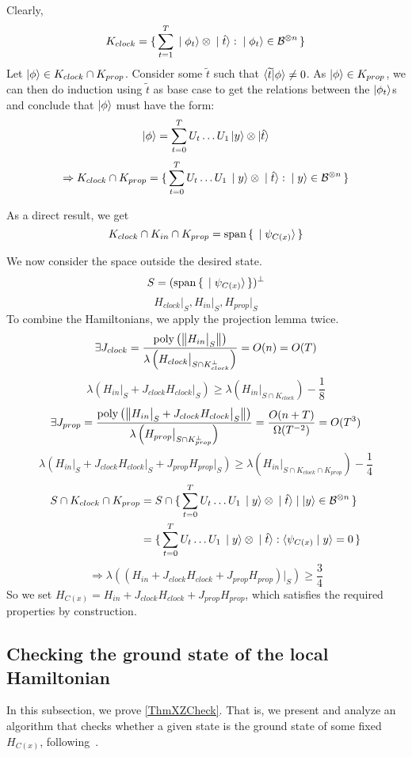 	Clearly,
	$$K_{clock}=\set{\sum_{t=1}^T \ket{\phi_t}\otimes\ket{\hat{t}}:\ket{\phi_t}\in\mathcal{B}^{\otimes n}}$$
	Let $\ket\phi\in K_{clock}\cap K_{prop}$.
	Consider some $\widetilde{t}$ such that $\braket{\widetilde{t}|\phi}\ne0$.
	As $\ket\phi\in K_{prop}$, we can then do induction using $\widetilde{t}$ as base case to get the relations between the $\ket{\phi_t}$s and conclude that $\ket\phi$ must have the form:
	$$\ket\phi=\sum_{t=0}^TU_t\ldots U_1\ket{y}\otimes\ket{\hat{t}}$$
	$$\Rightarrow K_{clock}\cap K_{prop}=\set{\sum_{t=0}^TU_t\ldots U_1\ket{y}\otimes\ket{\hat{t}}: \ket{y}\in\mathcal{B}^{\otimes n}}$$

	As a direct result, we get
	$$K_{clock}\cap K_{in}\cap K_{prop}=\operatorname*{\operatorname{span}}\set{\ket{\psi_{C(x)}}}$$

We now consider the space outside the desired state.
$$S=(\operatorname*{\operatorname{span}}\set{\ket{\psi_{C(x)}}})^\bot$$
$$H_{clock}\big|_S,H_{in}\big|_S,H_{prop}\big|_S$$
To combine the Hamiltonians, we apply the projection lemma twice.
$$\exists J_{clock}
=\frac{\operatorname*{\operatorname{poly}}\left(\left\lVert H_{in}\big|_S\right\rVert\right)}{\lambda\left(H_{clock}\big|_{S\cap K^\bot_{clock}}\right)}
=O(n)=O(T)$$
$$\lambda(H_{in}\big|_S+J_{clock}H_{clock}\big|_S)\geq
\lambda(H_{in}\big|_{S\cap K_{clock}})-\frac{1}{8}$$
$$\exists J_{prop}=\frac{\operatorname*{\operatorname{poly}}\left(\left\lVert H_{in}\big|_S+J_{clock}H_{clock}\big|_S\right\rVert\right)}{\lambda\left(H_{prop}\big|_{S\cap K^\bot_{prop}}\right)}
=\frac{O(n+T)}{\Omega(T^{-2})}=O(T^3)$$
$$\lambda(H_{in}\big|_S+J_{clock}H_{clock}\big|_S+J_{prop}H_{prop}\big|_S)\geq
\lambda(H_{in}\big|_{S\cap K_{clock}\cap K_{prop}})-\frac{1}{4}$$
\begin{align*}
	S\cap K_{clock}\cap K_{prop}&=S\cap\set{\sum_{t=0}^TU_t\ldots U_1\ket{y}\otimes\ket{\hat{t}}|\ket{y}\in\mathcal{B}^{\otimes n}}\\
	&=\set{\sum_{t=0}^TU_t\ldots U_1\ket{y}\otimes\ket{\hat{t}}:\braket{\psi_{C(x)}|y}=0}
\end{align*}
$$\Rightarrow\lambda((H_{in}+J_{clock}H_{clock}+J_{prop}H_{prop})\big|_S)\geq\frac{3}{4}$$
So we set $H_{C(x)}=H_{in}+J_{clock}H_{clock}+J_{prop}H_{prop}$, which satisfies the required properties by construction.

\subsection{Checking the ground state of the local Hamiltonian}

In this subsection, we prove \cref{ThmXZCheck}.
That is, we present and analyze an algorithm that checks whether a given state is the ground state of some fixed $H_{C(x)}$, following~\cite{PhysRevA.93.022326}.

